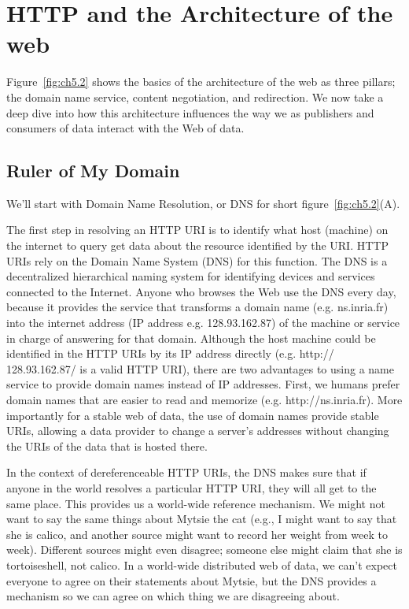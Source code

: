 \section{HTTP and the Architecture of the web}

Figure~\ref{fig:ch5.2} shows the basics of the architecture of the web as three pillars; the domain name service, content negotiation, and redirection.  We now take a deep dive into how this architecture influences the way we as  publishers and consumers of data interact with the Web of data. 

\hypertarget{king-of-my-domain}{%
\subsection{Ruler of My Domain}\label{king-of-my-domain}}

We'll start with Domain Name Resolution, or DNS for short  figure~\ref{fig:ch5.2}(A). 

The first step in resolving an HTTP URI is to identify what host (machine) on the internet 
to query get data about the resource identified by the URI. HTTP URIs rely on the Domain Name System (DNS) for this function.
The DNS is a decentralized hierarchical naming system for identifying
devices and services connected to the
Internet. Anyone who browses the Web use the DNS every day, because it provides the service that
transforms a domain name (e.g. ns.inria.fr)
into the internet address (IP address e.g. 128.93.162.87) of the machine
or service in charge of answering for that domain.  Although the host
machine could be identified in the HTTP URIs by its IP address directly
(e.g. http:// 128.93.162.87/ is a valid HTTP URI), there are two advantages to 
using a name service to provide domain names instead of IP addresses.  First, we humans prefer
domain names that are easier to read and memorize (e.g.
http://ns.inria.fr).   More importantly for a stable web of data, the use of domain names 
provide stable URIs, allowing a data provider to change a server's
addresses without changing the URIs of the data that is hosted there.


In the context of dereferenceable HTTP URIs, the DNS
makes sure that if anyone in the world resolves a particular HTTP URI, they
will all get to the same place.   This provides us a world-wide reference mechanism.  We 
might not want to say the same things about Mytsie the cat 
(e.g., I might want to say that she 
is calico, and another source might want to record her weight from week to week).  
Different sources might even disagree; someone else might claim that she is tortoiseshell, 
not calico.  In a world-wide distributed web of data, we can't expect everyone to agree on 
their statements
about Mytsie, but the DNS provides a mechanism so we can agree on which thing we are 
disagreeing about.

